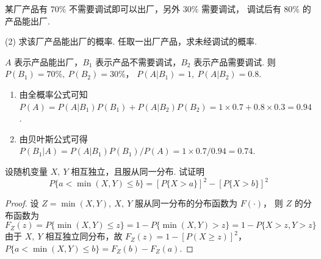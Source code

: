 \begin{problem}[本题12分]
  某厂产品有 $70\%$ 不需要调试即可以出厂，另外 $30\%$ 需要调试，
  调试后有 $80\%$ 的产品能出厂.
  \begin{tasks}[ label = \arabic*. ](2)
    \task 求该厂产品能出厂的概率.
    \task 任取一出厂产品，求未经调试的概率.
  \end{tasks}
\end{problem}
\scratch[12ex]
\begin{solution}
  $A$ 表示产品能出厂，$B_1$ 表示产品不需要调试，$B_2$ 表示产品需要调试.
  则$P(B_1) = 70\%,~ P(B_2) = 30\%$，
  $P(A | B_1) = 1,~ P(A | B_2) = 0.8$.
  \begin{enumerate}
    \item 由全概率公式可知
    $P(A) = P(A | B_1) P(B_1) + P(A | B_2) P(B_2)
          = 1 \times 0.7 + 0.8 \times 0.3 = 0.94$.
    \item 由贝叶斯公式可得
    $P(B_1 | A) = P(A | B_1) P(B_1)/P(A)
                = 1 \times 0.7/0.94 = 0.74$.
  \end{enumerate}
\end{solution}

\begin{problem}[本题6分]
  设随机变量 $X,~ Y$ 相互独立，且服从同一分布. 试证明
  \[P\{a < \min(X,Y) \leq b\} = [P\{X > a\}]^2 - [P\{X > b\}]^2\]
\end{problem}
\scratch[8ex]
\begin{solution}
  \begin{proof}
    设 $Z = \min(X,Y),~ X,~ Y$ 服从同一分布的分布函数为 $F(\cdot)$，
    则 $Z$ 的分布函数为
    \[
      F_Z(z) = P\{\min(X,Y) \leq z\} = 1 - P\{\min(X,Y) > z\}
             = 1 - P\{X > z,Y > z\}
    \]
    由于 $X,~ Y$ 相互独立同分布，故 $F_Z(z) = 1 - [P(X \ge z)]^2$，
    $P\{a < \min(X,Y) \leq b\} = F_Z(b) - F_Z(a)$.
  \end{proof}
\end{solution}

